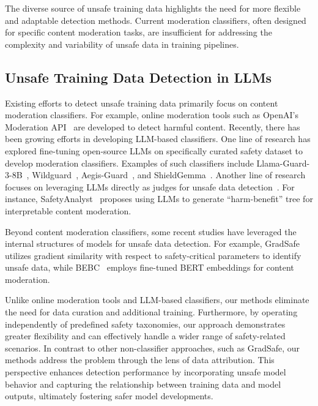 \documentclass[11pt]{article}
\begin{document}
The diverse source of unsafe training data highlights the need for more flexible and adaptable detection methods. Current moderation classifiers, often designed for specific content moderation tasks, are insufficient for addressing the complexity and variability of unsafe data in training pipelines. 

\subsection{Unsafe Training Data Detection in LLMs}

Existing efforts to detect unsafe training data primarily focus on content moderation classifiers. For example, online moderation tools such as OpenAI’s Moderation API~\citep{markov2023holisticapproachundesiredcontent} are developed to detect harmful content. Recently, there has been growing efforts in developing LLM-based classifiers. One line of research has explored fine-tuning open-source LLMs on specifically curated safety dataset to develop moderation classifiers. Examples of such classifiers include Llama-Guard-3-8B~\citep{dubey2024llama3herdmodels}, Wildguard~\citep{han2024wildguardopenonestopmoderation}, Aegis-Guard~\citep{ghosh2024aegis}, and ShieldGemma~\citep{zeng2024shieldgemmagenerativeaicontent}. Another line of research focuses on leveraging LLMs directly as judges for unsafe data detection~\citep{10.1145/3599696.3612895,li2024safetyanalystinterpretabletransparentsteerable}. For instance, SafetyAnalyst~\citep{li2024safetyanalystinterpretabletransparentsteerable} proposes using LLMs to generate ``harm-benefit'' tree for interpretable content moderation. 

Beyond content moderation classifiers, some recent studies have leveraged the internal structures of models for unsafe data detection. For example, GradSafe~\citep{xie2024gradsafedetectingjailbreakprompts} utilizes gradient similarity with respect to safety-critical parameters to identify unsafe data, while BEBC~\citep{zheng2024lightweightsafetyguardrailsusing} employs fine-tuned BERT embeddings for content moderation.

Unlike online moderation tools and LLM-based classifiers, our methods eliminate the need for data curation and additional training. Furthermore, by operating independently of predefined safety taxonomies, our approach demonstrates greater flexibility and can effectively handle a wider range of safety-related scenarios. In contrast to other non-classifier approaches, such as GradSafe, our methods address the problem through the lens of data attribution. This perspective enhances detection performance by incorporating unsafe model behavior and capturing the relationship between training
data and model outputs, ultimately fostering safer model developments.
\end{document}
